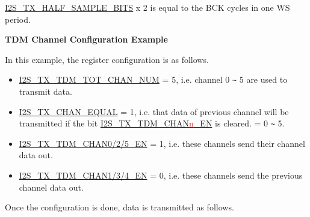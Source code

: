 \documentclass[main\_\_CN.tex]{subfiles}
\begin{document}
\hyperref[fielddesc:I2STXHALFSAMPLEBITS]{I2S\_TX\_HALF\_SAMPLE\_BITS} x 2 is equal to the BCK cycles in one WS period.

\textbf{TDM Channel Configuration Example}

In this example, the register configuration is as follows.

\begin{itemize}
    \item \hyperref[fielddesc:I2STXTDMTOTCHANNUM]{I2S\_TX\_TDM\_TOT\_CHAN\_NUM} = 5, i.e. channel 0 \verb+~+ 5 are used to transmit data.
    \item \hyperref[fielddesc:I2STXCHANEQUAL]{I2S\_TX\_CHAN\_EQUAL} = 1, i.e. that data of previous channel will be transmitted if the bit \hyperref[fielddesc:I2STXTDMCHAN0EN]{I2S\_TX\_TDM\_CHAN{\textcolor{red}{n}}\_EN} is cleared.  = 0 \verb+~+ 5.
    \item \hyperref[fielddesc:I2STXTDMCHAN0EN]{I2S\_TX\_TDM\_CHAN0/2/5\_EN} = 1, i.e. these channels send their channel data out.
    \item \hyperref[fielddesc:I2STXTDMCHAN0EN]{I2S\_TX\_TDM\_CHAN1/3/4\_EN} = 0, i.e. these channels send the previous channel data out.
\end{itemize}

Once the configuration is done, data is transmitted as follows.
\end{document}
